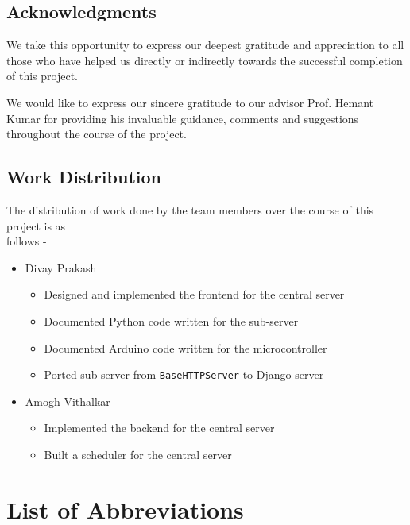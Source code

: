 \documentclass[letterpaper,11pt]{report}
\begin{document}
\newpage
\section*{Acknowledgments}\label{section:acknowledgments}
\pagestyle{plain}
We take this opportunity to express our deepest gratitude and appreciation to all those
who have helped us directly or indirectly towards the successful completion of this project.
\par
We would like to express our sincere gratitude to our advisor Prof. Hemant Kumar for providing his invaluable guidance, comments and suggestions throughout the course of the project.

\vspace{2in}

\section*{Work Distribution}\label{section:workdistribution}
The distribution of work done by the team members over the course of this project is as\\ follows -
\begin{itemize}
    \item Divay Prakash
    \begin{itemize}
        \item Designed and implemented the frontend for the central server
        \item Documented Python code written for the sub-server
        \item Documented Arduino code written for the microcontroller
        \item Ported sub-server from \verb|BaseHTTPServer| to Django server
    \end{itemize}
    \item Amogh Vithalkar
    \begin{itemize}
        \item Implemented the backend for the central server
        \item Built a scheduler for the central server
    \end{itemize}
\end{itemize}

\newpage
\tableofcontents

\listoffigures
{}

\newpage
{}
\chapter*{List of Abbreviations}
\printacronyms[include-classes=abbrev, heading=none]
\end{document}
